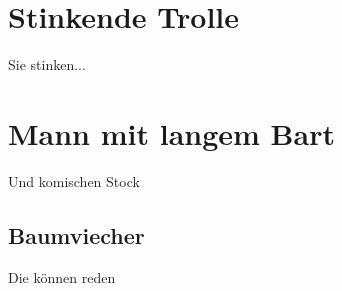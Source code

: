\section{Stinkende Trolle}
Sie stinken...

\section{Mann mit langem Bart}
Und komischen Stock

\subsection{Baumviecher}
Die können reden
